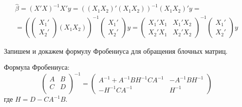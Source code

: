 \begin{problem}
\begin{sol}
\begin{multline*}
\hat\beta=(X'X)^{-1}X'y=((X_1X_2)'(X_1X_2))^{-1}(X_1X_2)'y=\\
=\left(
\begin{pmatrix}
X_1'\\
X_2'
\end{pmatrix}(X_1X_2)\right)^{-1}
\begin{pmatrix}
X_1'\\
X_2'
\end{pmatrix}y=
\begin{pmatrix}
X_1'X_1 & X_1'X_2\\
X_2'X_1 & X_2'X_2
\end{pmatrix}^{-1}
\begin{pmatrix}
X_1'\\
X_2'
\end{pmatrix}y
\end{multline*}

Запишем и докажем формулу Фробениуса для обращения блочных матриц.

Формула Фробениуса:
\[
\begin{pmatrix} A & B \\
C & D \\
\end{pmatrix}^{-1}=
\begin{pmatrix}
A^{-1} +A^{-1} BH^{-1} CA^{-1}  & -A^{-1} BH^{-1}\\
 -H^{-1} CA^{-1}  & H^{-1}
\end{pmatrix}
\]
где $H=D-CA^{-1}B$.


\end{sol}
\end{problem}
